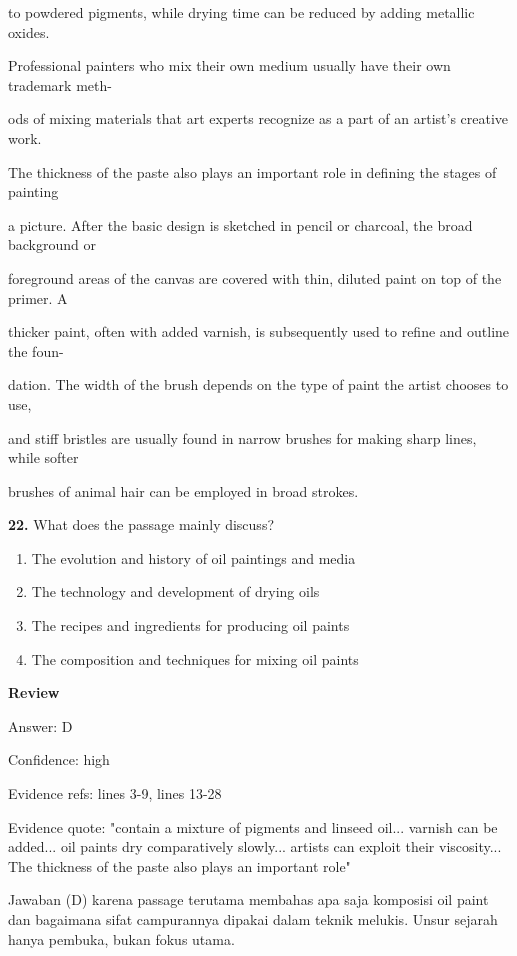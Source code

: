 \documentclass[12pt]{article}
\begin{document}
to powdered pigments, while drying time can be reduced by adding metallic oxides.\par
Professional painters who mix their own medium usually have their own trademark meth-\par
ods of mixing materials that art experts recognize as a part of an artist's creative work.\par
The thickness of the paste also plays an important role in defining the stages of painting\par
a picture. After the basic design is sketched in pencil or charcoal, the broad background or\par
foreground areas of the canvas are covered with thin, diluted paint on top of the primer. A\par
thicker paint, often with added varnish, is subsequently used to refine and outline the foun-\par
dation. The width of the brush depends on the type of paint the artist chooses to use,\par
and stiff bristles are usually found in narrow brushes for making sharp lines, while softer\par
brushes of animal hair can be employed in broad strokes.\par
\endgroup
\medskip
\noindent\textbf{22.} What does the passage mainly discuss?
\begin{enumerate}[label=(\Alph*),leftmargin=*,itemsep=0.2em]
\item The evolution and history of oil paintings and media
\item The technology and development of drying oils
\item The recipes and ingredients for producing oil paints
\item The composition and techniques for mixing oil paints
\end{enumerate}
\par
\begingroup
\setlength{\parskip}{0pt}
\setlength{\parindent}{0pt}
\textbf{Review}\par
Answer: D\par
Confidence: high\par
Evidence refs: lines 3-9, lines 13-28\par
Evidence quote: "contain a mixture of pigments and linseed oil... varnish can be added... oil paints dry comparatively slowly... artists can exploit their viscosity... The thickness of the paste also plays an important role"\par
Jawaban (D) karena passage terutama membahas apa saja komposisi oil paint dan bagaimana sifat campurannya dipakai dalam teknik melukis. Unsur sejarah hanya pembuka, bukan fokus utama.\par
\end{document}
